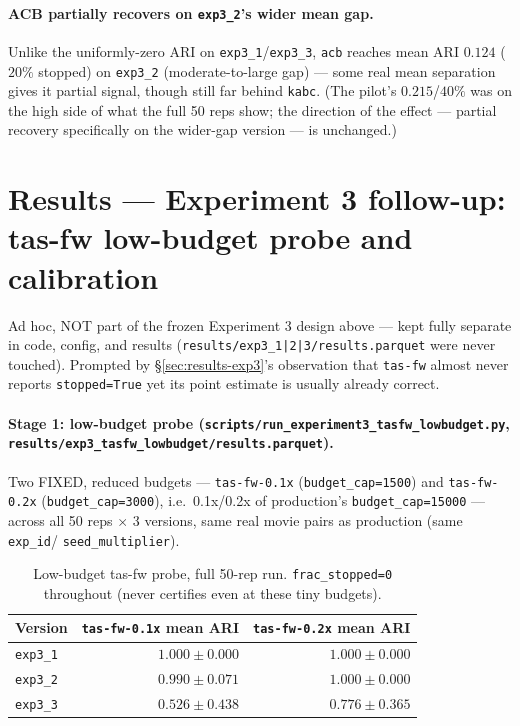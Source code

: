 \documentclass[11pt]{article}
\begin{document}
\paragraph{ACB partially recovers on \texttt{exp3\_2}'s wider mean gap.}
Unlike the uniformly-zero ARI on \texttt{exp3\_1}/\texttt{exp3\_3},
\texttt{acb} reaches mean ARI $0.124$ ($20\%$ stopped) on \texttt{exp3\_2}
(moderate-to-large gap) --- some real mean separation gives it partial
signal, though still far behind \texttt{kabc}. (The pilot's $0.215$/$40\%$
was on the high side of what the full 50 reps show; the direction of the
effect --- partial recovery specifically on the wider-gap version --- is
unchanged.)

\FloatBarrier
\section{Results --- Experiment 3 follow-up: tas-fw low-budget probe and calibration}
\label{sec:results-exp3-tasfw-followup}

Ad hoc, NOT part of the frozen Experiment 3 design above --- kept fully
separate in code, config, and results (\texttt{results/exp3\_1|2|3/results.parquet}
were never touched). Prompted by \S\ref{sec:results-exp3}'s observation
that \texttt{tas-fw} almost never reports \texttt{stopped=True} yet its
point estimate is usually already correct.

\paragraph{Stage 1: low-budget probe
(\texttt{scripts/run\_experiment3\_tasfw\_lowbudget.py},
\texttt{results/exp3\_tasfw\_lowbudget/results.parquet}).} Two FIXED,
reduced budgets --- \texttt{tas-fw-0.1x} (\texttt{budget\_cap=1500}) and
\texttt{tas-fw-0.2x} (\texttt{budget\_cap=3000}), i.e.\ 0.1x/0.2x of
production's \texttt{budget\_cap=15000} --- across all 50 reps $\times$ 3
versions, same real movie pairs as production (same \texttt{exp\_id}/
\texttt{seed\_multiplier}).

\begin{table}[h]
\centering
\small
\begin{tabular}{lrr}
\toprule
Version & \texttt{tas-fw-0.1x} mean ARI & \texttt{tas-fw-0.2x} mean ARI \\
\midrule
\texttt{exp3\_1} & $1.000 \pm 0.000$ & $1.000 \pm 0.000$ \\
\texttt{exp3\_2} & $0.990 \pm 0.071$ & $1.000 \pm 0.000$ \\
\texttt{exp3\_3} & $0.526 \pm 0.438$ & $0.776 \pm 0.365$ \\
\bottomrule
\end{tabular}
\caption{Low-budget tas-fw probe, full 50-rep run. \texttt{frac\_stopped=0}
throughout (never certifies even at these tiny budgets).}
\end{table}
\end{document}
